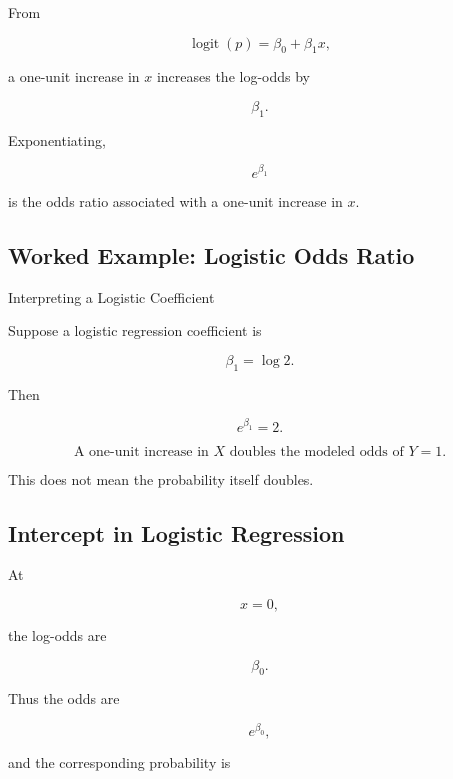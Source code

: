 From

\[
\operatorname{logit}(p)
=
\beta_0+\beta_1x,
\]

a one-unit increase in \(x\) increases the log-odds by

\[
\boxed{
\beta_1.
}
\]

Exponentiating,

\[
\boxed{
e^{\beta_1}
}
\]

is the odds ratio associated with a one-unit increase in \(x\).

\subsection{Worked Example: Logistic Odds Ratio}
\label{subsec:worked-logistic-odds-ratio}

\begin{workedexamplebox}{Interpreting a Logistic Coefficient}

Suppose a logistic regression coefficient is

\[
\beta_1=\log 2.
\]

Then

\[
e^{\beta_1}=2.
\]

\begin{answerbox}
\[
\boxed{
\text{A one-unit increase in }X
\text{ doubles the modeled odds of }Y=1.
}
\]
\end{answerbox}

This does not mean the probability itself doubles.

\end{workedexamplebox}

\subsection{Intercept in Logistic Regression}
\label{subsec:logistic-intercept}

At

\[
x=0,
\]

the log-odds are

\[
\boxed{
\beta_0.
}
\]

Thus the odds are

\[
\boxed{
e^{\beta_0},
}
\]

and the corresponding probability is


